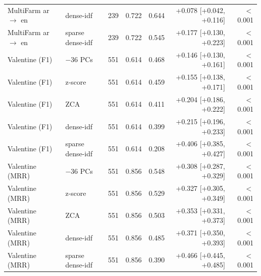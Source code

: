 \begin{longtable}{@{}lllrrrr@{}}
MultiFarm ar $\to$ en & dense-idf & 239 & 0.722 & 0.644 & +0.078 [+0.042, +0.116] & $<$0.001 \\
MultiFarm ar $\to$ en & sparse dense-idf & 239 & 0.722 & 0.545 & +0.177 [+0.130, +0.223] & $<$0.001 \\
Valentine (F1) & $-$36 PCs & 551 & 0.614 & 0.468 & +0.146 [+0.130, +0.161] & $<$0.001 \\
Valentine (F1) & z-score & 551 & 0.614 & 0.459 & +0.155 [+0.138, +0.171] & $<$0.001 \\
Valentine (F1) & ZCA & 551 & 0.614 & 0.411 & +0.204 [+0.186, +0.222] & $<$0.001 \\
Valentine (F1) & dense-idf & 551 & 0.614 & 0.399 & +0.215 [+0.196, +0.233] & $<$0.001 \\
Valentine (F1) & sparse dense-idf & 551 & 0.614 & 0.208 & +0.406 [+0.385, +0.427] & $<$0.001 \\
Valentine (MRR) & $-$36 PCs & 551 & 0.856 & 0.548 & +0.308 [+0.287, +0.329] & $<$0.001 \\
Valentine (MRR) & z-score & 551 & 0.856 & 0.529 & +0.327 [+0.305, +0.349] & $<$0.001 \\
Valentine (MRR) & ZCA & 551 & 0.856 & 0.503 & +0.353 [+0.331, +0.373] & $<$0.001 \\
Valentine (MRR) & dense-idf & 551 & 0.856 & 0.485 & +0.371 [+0.350, +0.393] & $<$0.001 \\
Valentine (MRR) & sparse dense-idf & 551 & 0.856 & 0.390 & +0.466 [+0.445, +0.485] & $<$0.001 \\
\end{longtable}
